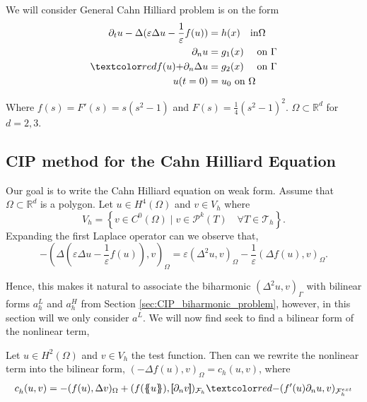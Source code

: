 We will consider General Cahn Hilliard problem is on the form
\begin{equation}
\label{eq:ch_exact}
    \begin{split}
        \partial _{t} u  - \Delta ( \varepsilon  \Delta u - \frac{1}{\varepsilon } f( u) ) & =  h(x)  \quad \text{in} \Omega \\
        \partial _{n} u & =  g_{1}(x)  \quad \text{ on } \Gamma \\
        \red{ f( u) +}  \partial _{n} \Delta u & = g_{2}(x)  \quad \text{ on } \Gamma  \\
        u(t=0) & = u_{0}   \text{ on } \Omega
    \end{split}
\end{equation}

Where $f( s)  = F' ( s)=s( s^2 -1)  $ and $F( s)  = \frac{1}{4} ( s^2 - 1)^2 $. $\Omega \subset \mathbb{R} ^{d} $  for $d = 2,3$.



\subsection{ CIP method for the Cahn Hilliard Equation}%
\label{sub:writing_the_cahn_hilliard_equation_of_weak_form}

Our goal is to write the Cahn Hilliard equation on weak form.
Assume that $\Omega  \subset \mathbb{R} ^{d}$ is a polygon.
 Let $u \in  H^{4}( \Omega ) $ and $v \in V_{h} $ where
\[
V_{h} = \left\{ v \in C^{0}( \Omega )   \mid v\in \mathcal{P} ^{k} ( T) \quad \forall T \in \mathcal{T} _{h} \right\}.
\]
Expanding the first Laplace operator can we observe that,
\[
- ( \Delta ( \varepsilon  \Delta u - \frac{1}{\varepsilon } f( u) ) ,v )_{\Omega } = \varepsilon ( \Delta^{2} u ,v )_{\Omega } - \frac{1}{\varepsilon } ( \Delta f( u)  ,v )_{\Omega }.
\]

Hence, this makes it natural to associate the biharmonic $( \Delta ^2 u,v)_{\Gamma } $ with bilinear forms $a_h^{L} $ and $a^{H}_{h} $ from Section \ref{sec:CIP_biharmonic_problem}, however, in this section will we only consider $a^{L}$.
We will now find seek to find a bilinear form of the nonlinear term,

\begin{lemma}
    Let $u \in H^2( \Omega ) $ and $v \in V_{h}$ the test function.
Then can we rewrite the nonlinear term into the bilinear form, $( -\Delta f( u) , v)_{\Omega } = c_{h}(u,v )   $, where
\[
    c^{}_{h} ( u,v) = - ( f( u), \Delta v )_{ \Omega } + ( f( \mean{ u }  ), \jump{ \partial _{n} v }   )_{\mathcal{F}_{h} }  \red{- ( f' (  u  )  \partial _{n}u ,  v      )_{\mathcal{F}_{h} ^{ext}}}
\]

\end{lemma}

